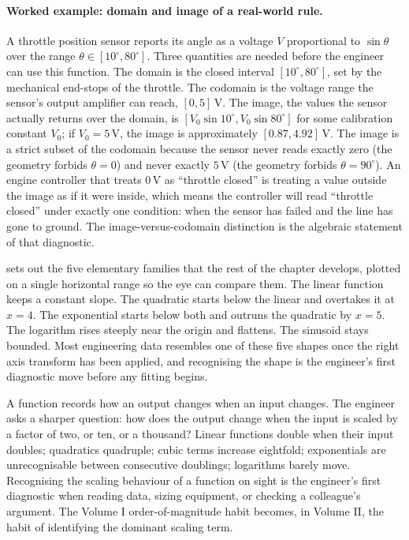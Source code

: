 \paragraph{Worked example: domain and image of a real-world rule.}
A throttle position sensor reports its angle as a voltage $V$
proportional to $\sin\theta$ over the range $\theta \in [10^{\circ},
80^{\circ}]$. Three quantities are needed before the engineer can
use this function. The domain is the closed interval $[10^{\circ},
80^{\circ}]$, set by the mechanical end-stops of the throttle.
The codomain is the voltage range the sensor's output amplifier can
reach, $[0, 5]\,\si{\volt}$. The image, the values the sensor
actually returns over the domain, is $[V_{0} \sin 10^{\circ},
V_{0} \sin 80^{\circ}]$ for some calibration constant $V_{0}$;
if $V_{0} = 5\,\si{\volt}$, the image is approximately $[0.87,
4.92]\,\si{\volt}$. The image is a strict subset of the codomain
because the sensor never reads exactly zero (the geometry forbids
$\theta = 0$) and never exactly $5\,\si{\volt}$ (the geometry forbids
$\theta = 90^{\circ}$). An engine controller that treats $0\,\si
{\volt}$ as ``throttle closed'' is treating a value outside the
image as if it were inside, which means the controller will read
``throttle closed'' under exactly one condition: when the sensor has
failed and the line has gone to ground. The image-versus-codomain
distinction is the algebraic statement of that diagnostic.



 sets out the five elementary
families that the rest of the chapter develops, plotted on a single
horizontal range so the eye can compare them. The linear function
keeps a constant slope. The quadratic starts below the linear and
overtakes it at $x = 4$. The exponential starts below both and
outruns the quadratic by $x = 5$. The logarithm rises steeply near
the origin and flattens. The sinusoid stays bounded. Most engineering
data resembles one of these five shapes once the right axis transform
has been applied, and recognising the shape is the engineer's first
diagnostic move before any fitting begins.

\begin{archetype}[Scaling]
A function records how an output changes when an input changes. The
engineer asks a sharper question: how does the output change when the
input is scaled by a factor of two, or ten, or a thousand? Linear
functions double when their input doubles; quadratics quadruple;
cubic terms increase eightfold; exponentials are unrecognisable
between consecutive doublings; logarithms barely move. Recognising
the scaling behaviour of a function on sight is the engineer's first
diagnostic when reading data, sizing equipment, or checking a
colleague's argument. The Volume I order-of-magnitude habit becomes,
in Volume II, the habit of identifying the dominant scaling term.
\end{archetype}

